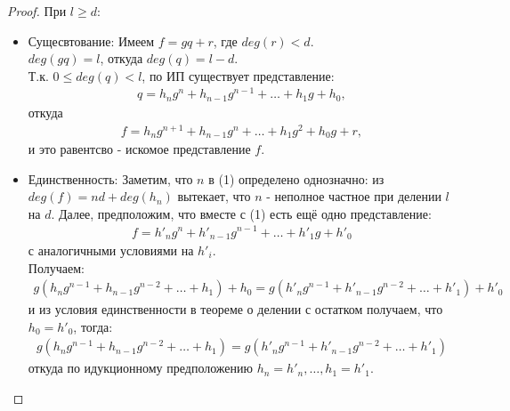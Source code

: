 \begin{normalsize}
\begin{proof}
        При $l \geqslant d$:
        \begin{itemize}
            \item Сущесвтование:
                Имеем $f = gq + r$, где $deg(r) < d$. \\
                $deg(gq) = l$, откуда $deg(q) = l - d.$ \\
                Т.к. $0 \leqslant deg(q) < l$, по ИП существует представление:
                \begin{align*}
                    q = h_ng^{n} + h_{n-1}g^{n-1} + \dots + h_1g + h_0,
                \end{align*}
                откуда
                \begin{align*}
                    f = h_ng^{n+1} + h_{n-1}g^n + \dots + h_1g^2 + h_0g + r,
                \end{align*}
                и это равентсво - искомое представление $f$.

            \item Единственность:
                Заметим, что $n$ в (1) определено однозначно: из $deg(f) = nd + deg(h_n)$
                вытекает, что $n$ - неполное частное при делении $l$ на $d$.
                Далее, предположим, что вместе с (1) есть ещё одно представление:
                \begin{align*}
                    f = h'_ng^n + h'_{n-1}g^{n-1} + \dots + h'_1g + h'_0
                \end{align*}
                с аналогичными условиями на $h'_i$. \\

                Получаем: 
                \begin{align*}
                    g(h_ng^{n-1} + h_{n-1}g^{n-2} + \dots + h_1) + h_0 = 
                    g(h'_ng^{n-1} + h'_{n-1}g^{n-2} + \dots + h'_1) + h'_0
                \end{align*}
                и из условия единственности в теореме о делении с остатком получаем, что $h_0 = h'_0$, тогда:
                \begin{align*}
                    g(h_ng^{n-1} + h_{n-1}g^{n-2} + \dots + h_1) =
                    g(h'_ng^{n-1} + h'_{n-1}g^{n-2} + \dots + h'_1)
                \end{align*}
                откуда по идукционному предположению $h_n = h'_n, \dots, h_1 = h'_1$.
            \end{itemize}
    \end{proof}



\end{normalsize}